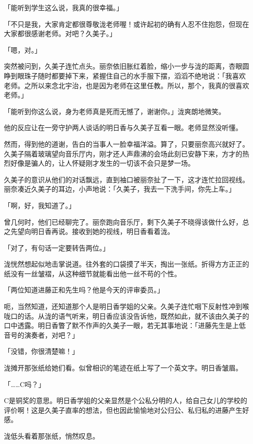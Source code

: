 \documentclass[UTF8]{ctexart}
\begin{document}
    「能听到学生这么说，我真的很幸福。」 

    「不只是我，大家肯定都很尊敬泷老师喔！或许起初的确有人忍不住抱怨，但现在大家都很感谢老师。对吧？久美子。」 

    「嗯，对。」 

    突然被问到，久美子连忙点头。丽奈依旧胀红着脸，缩小一步与泷的距离，杏眼圆睁到眼珠子随时都要掉下来，紧握住自己的水手服下摆，滔滔不绝地说：「我喜欢老师。之所以来念北宇治，也是因为老师在这里任教。所以，那个，我真的很喜欢老师。」 

    「能听到你这么说，身为老师真是死而无憾了，谢谢你。」泷爽朗地微笑。 

    他的反应让在一旁守护两人谈话的明日香与久美子互看一眼。老师显然没听懂。 

    然而，得到他的道谢，告白的当事人一脸幸福洋溢。算了，只要丽奈高兴就好了。久美子隔着玻璃望向音乐厅内，刚才还人声鼎沸的会场此刻已安静下来，方才的热烈好像是骗人的，让人怀疑刚才发生的一切该不会只是梦一场。 

    久美子的意识从他们的对话飘远，直到袖口被丽奈扯了一下，这才连忙拉回视线。丽奈凑近久美子的耳边，小声地说：「久美子，我去一下洗手间，你先上车。」 

    「啊，好，我知道了。」 

    曾几何时，他们已经聊完了。丽奈跑向音乐厅，剩下久美子不晓得该做什么好，总之先望向明日香再说。接收到她的视线，明日香看着泷。 

    「对了，有句话一定要转告两位。」 

    泷恍然想起似地击掌说道。往外套的口袋摸了半天，掏出一张纸。折得方方正正的纸没有一丝皱褶，从这种细节就能看出他一丝不苟的个性。 

    「两位知道进藤正和先生吗？他是今天的评审委员。」 

    呃，当然知道，还知道那个人是明日香学姐的父亲。久美子连忙咽下反射性冲到喉咙口的话。从泷的语气听来，明日香应该没告诉他，既然如此，就不该由久美子的口中透露。明日香瞥了默不作声的久美子一眼，若无其事地说：「进藤先生是上低音号的演奏者，对吧？」 

    「没错，你很清楚嘛！」 

    泷摊开那张纸给她们看。似曾相识的笔迹在纸上写了一个英文字。明日香皱眉。 

    「……C吗？」 

    C是铜奖的意思。明日香学姐的父亲显然是个公私分明的人，给自己女儿的学校的评价啊！这是久美子直率的想法，但也因此愉愉地对公归公、私归私的进藤产生好感。 

    泷低头看着那张纸，悄然叹息。 
\end{document}
